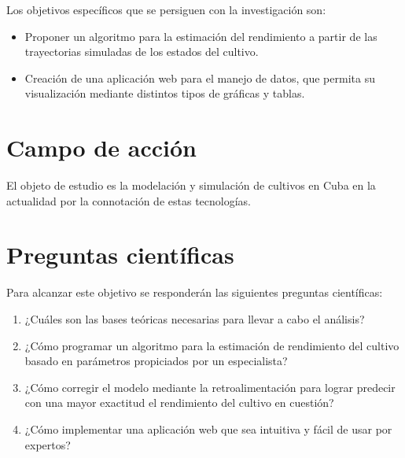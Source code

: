 Los objetivos específicos que se persiguen con la investigación son:

\begin{itemize}
	\item Proponer un algoritmo para la estimación del rendimiento a partir de las trayectorias simuladas de los estados del cultivo.
	\item Creación de una aplicación web para el manejo de datos, que permita su visualización mediante distintos tipos de gráficas y tablas.
\end{itemize}

\section*{Campo de acción}
El objeto de estudio es la modelación y simulación de cultivos en Cuba en la actualidad por la connotación de estas tecnologías. 

\section*{Preguntas científicas}
Para alcanzar este objetivo se responderán las siguientes preguntas científicas:

\begin{enumerate}
	\item ¿Cuáles son las bases teóricas necesarias para llevar a cabo el análisis?
	\item ¿Cómo programar un algoritmo para la estimación de rendimiento del cultivo basado en parámetros propiciados por un especialista?
	\item ¿Cómo corregir el modelo mediante la retroalimentación para lograr predecir con una mayor exactitud el rendimiento del cultivo en cuestión?
	\item ¿Cómo implementar una aplicación web que sea intuitiva y fácil de usar por expertos?
\end{enumerate}

